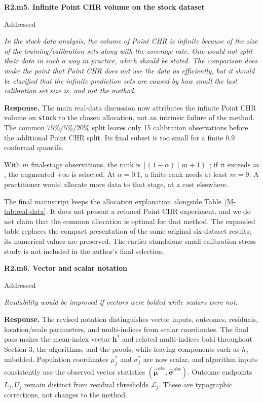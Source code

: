 \documentclass[11pt]{article}
\newcommand{\mstab}[1]{Table~\ref*{M-#1}}
\newcommand{\point}[3]{\par\Needspace{7\baselineskip}\medskip
\noindent\parbox[t]{0.77\linewidth}{\textbf{#1}}\hfill
\parbox[t]{0.21\linewidth}{\raggedleft\small\sffamily #2}\par\nopagebreak
{\color{ReviewerBlue}\small\itshape #3\par}\textbf{Response.} }
\begin{document}
\point{R2.m5. Infinite Point CHR volume on the stock dataset}{Addressed}{In the stock data analysis, the volume of Point CHR is infinite
because of the size of the training/calibration sets along with
the coverage rate. One would not split their data in such a way
in practice, which should be stated. The comparison does make
the point that Point CHR does not use the data as efficiently,
but it should be clarified that the infinite prediction sets
are caused by how small the last calibration set size is, and
not the method.}
\label{response:R2.m5}
The main real-data discussion now attributes the infinite Point CHR volume on \texttt{stock} to the chosen allocation, not an intrinsic failure of the method. The common $75\%/5\%/20\%$ split leaves only 15 calibration observations before the additional Point CHR split. Its final subset is too small for a finite $0.9$ conformal quantile.

With $m$ final-stage observations, the rank is $\lceil(1-\alpha)(m+1)\rceil$; if it exceeds $m$, the augmented $+\infty$ is selected. At $\alpha=0.1$, a finite rank needs at least $m=9$. A practitioner would allocate more data to that stage, at a cost elsewhere.

The final manuscript keeps the allocation explanation alongside \mstab{tab:real-data}. It does not present a retuned Point CHR experiment, and we do not claim that the common allocation is optimal for that method. The expanded table replaces the compact presentation of the same original six-dataset results; its numerical values are preserved. The earlier standalone small-calibration stress study is not included in the author's final selection.

\point{R2.m6. Vector and scalar notation}{Addressed}{Readability would be improved if vectors were bolded while
scalars were not.}
\label{response:R2.m6}
The revised notation distinguishes vector inputs, outcomes, residuals,
location/scale parameters, and multi-indices from scalar coordinates.
The final pass makes the mean-index vector $\mathbf h^*$ and related
multi-indices bold throughout Section 3, the algorithms, and the proofs,
while leaving components such as $h_j$ unbolded. Population coordinates
$\mu_j^*$ and $\sigma_j^*$ are now scalar, and algorithm inputs consistently
use the observed vector statistics
$(\hat{\boldsymbol\mu}^{\mathrm{obs}},\hat{\boldsymbol\sigma}^{\mathrm{obs}})$.
Outcome endpoints $L_j,U_j$ remain distinct from residual thresholds
$\mathcal L_j$. These are typographic corrections, not changes to the method.
\end{document}
